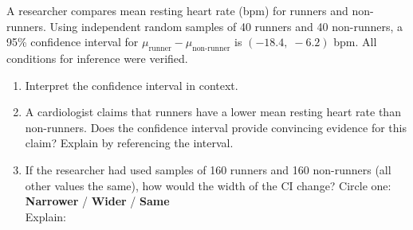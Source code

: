 \documentclass[10pt]{article}
\begin{document}
\namedateperiod

\vspace{0.15in}

A researcher compares mean resting heart rate (bpm) for runners and non-runners.
Using independent random samples of 40 runners and 40 non-runners,
a 95\% confidence interval for $\mu_{\text{runner}} - \mu_{\text{non-runner}}$ is
$(-18.4,\; -6.2)$ bpm. All conditions for inference were verified.

\begin{enumerate}
  \item Interpret the confidence interval in context.

  \item A cardiologist claims that runners have a lower mean resting heart rate than
        non-runners. Does the confidence interval provide convincing evidence for this
        claim? Explain by referencing the interval.

  \item If the researcher had used samples of 160 runners and 160 non-runners
        (all other values the same), how would the width of the CI change?
        Circle one: \quad \textbf{Narrower} \quad / \quad \textbf{Wider} \quad / \quad \textbf{Same} \\[4pt]
        Explain: \writeline
\end{enumerate}
\end{document}
